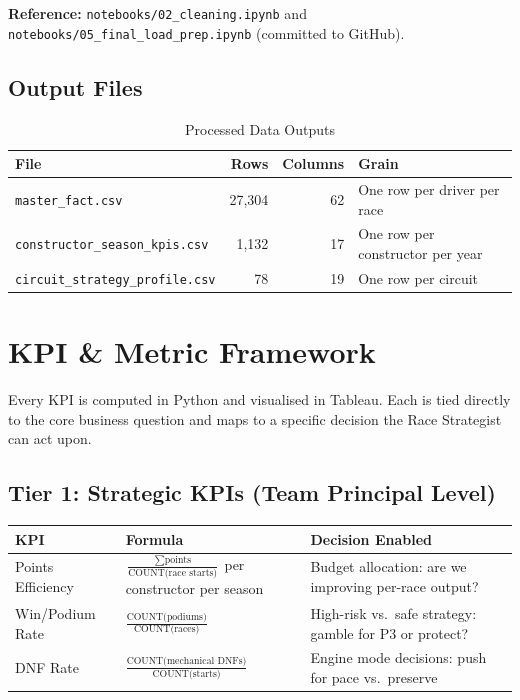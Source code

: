 \documentclass[12pt, a4paper]{article}
\begin{document}
\textbf{Reference:} \texttt{notebooks/02\_cleaning.ipynb} and \texttt{notebooks/05\_final\_load\_prep.ipynb} (committed to GitHub).

\subsection{Output Files}

\begin{table}[H]
\centering
\caption{Processed Data Outputs}
\begin{tabular}{l r r l}
\toprule
\textbf{File} & \textbf{Rows} & \textbf{Columns} & \textbf{Grain} \\
\midrule
\texttt{master\_fact.csv}               & 27,304 & 62 & One row per driver per race \\
\texttt{constructor\_season\_kpis.csv}  & 1,132  & 17 & One row per constructor per year \\
\texttt{circuit\_strategy\_profile.csv} & 78     & 19 & One row per circuit \\
\bottomrule
\end{tabular}
\end{table}

\newpage

\section{KPI \& Metric Framework}

Every KPI is computed in Python and visualised in Tableau. Each is tied directly to the core business question and maps to a specific decision the Race Strategist can act upon.

\subsection{Tier 1: Strategic KPIs (Team Principal Level)}

\begin{table}[H]
\centering
\begin{tabularx}{\textwidth}{l l X}
\toprule
\textbf{KPI} & \textbf{Formula} & \textbf{Decision Enabled} \\
\midrule
Points Efficiency & $\frac{\sum \text{points}}{\text{COUNT(race starts)}}$ per constructor per season & Budget allocation: are we improving per-race output? \\[6pt]
Win/Podium Rate & $\frac{\text{COUNT(podiums)}}{\text{COUNT(races)}}$ & High-risk vs.\ safe strategy: gamble for P3 or protect? \\[6pt]
DNF Rate & $\frac{\text{COUNT(mechanical DNFs)}}{\text{COUNT(starts)}}$ & Engine mode decisions: push for pace vs.\ preserve \\
\bottomrule
\end{tabularx}
\end{table}
\end{document}
